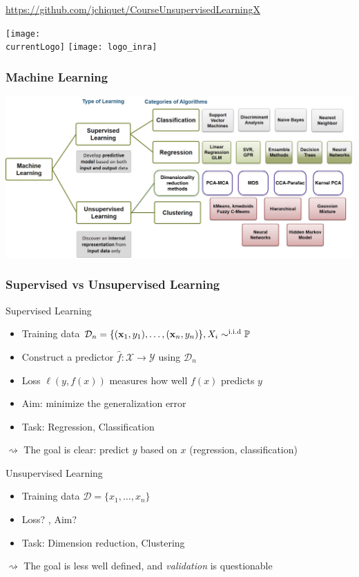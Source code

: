 \documentclass{beamer}\usepackage[]{graphicx}\usepackage[]{color}
\title{\currentCourse}
\subtitle{\huge\currentChapter\normalsize}
\institute{\currentInstitute}
\date{\currentDate}
\def\currentLogo{../common_figs/logo_X}
\newcommand{\dotitlepage}{%
  \begin{frame}
    \titlepage
    \vfill
    \begin{center}
        \scriptsize\url{https://github.com/jchiquet/CourseUnsupervisedLearningX}
    \end{center}
    \vfill
    \texttt{[image: \\currentLogo]}\hfill
    \texttt{[image: logo\_inra]}
  \end{frame}
}
\begin{document}
\dotitlepage

\begin{frame}
	\frametitle{Machine Learning}

	\begin{center}
		\includegraphics[width=\textwidth]{figures/Learning+Types.jpg}
	\end{center}

\end{frame}

\begin{frame}
  \frametitle{Supervised vs Unsupervised Learning}
  
  \begin{block}{Supervised Learning}
    \begin{itemize}
    \item Training data $\mathcal{D}_n = \{(\mathbf{x}_1, y_1), \ldots, (\mathbf{x}_n, y_n)\}, X_i \sim^{\text{i.i.d}} \mathbb{P}$
    \item Construct a predictor $\hat f : \mathcal{X} \rightarrow \mathcal{Y}$ using $\mathcal{D}_n$
    \item Loss $\ell(y, f(x))$ measures how well $f(x)$ predicts $y$
    \item Aim: minimize the generalization error
    \item Task: Regression, Classification
    \end{itemize}
    $\rightsquigarrow$ The goal is clear: predict $y$ based on $x$ (regression, classification)
  \end{block}

  \begin{block}{Unsupervised Learning}
  \begin{itemize}
    \item Training data $\mathcal{D} = \{x_1, \ldots, x_n\}$
    \item Loss? , Aim?
    \item Task: Dimension reduction, Clustering
  \end{itemize}  
  $\rightsquigarrow$ The goal is less well defined, and \emph{validation} is questionable
  \end{block}
  
\end{frame}
\end{document}
